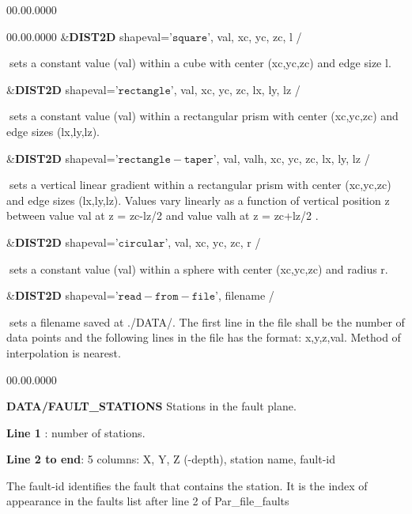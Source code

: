 \begin{lyxlist}{00.00.0000}
\begin{lyxlist}{00.00.0000}
\&\textbf{DIST2D} shapeval='$\mathtt{square}$', val, xc, yc, zc, l /


$\;$sets a constant value (val) within a cube with center (xc,yc,zc)
and edge size l.


\&\textbf{DIST2D} shapeval='$\mathtt{rectangle}$', val, xc, yc, zc,
lx, ly, lz /


$\;$sets a constant value (val) within a rectangular prism with center
(xc,yc,zc) and edge sizes (lx,ly,lz).


\&\textbf{DIST2D} shapeval='$\mathtt{rectangle-taper}$', val, valh,
xc, yc, zc, lx, ly, lz /


$\;$sets a vertical linear gradient within a rectangular prism with
center (xc,yc,zc) and edge sizes (lx,ly,lz). Values vary linearly
as a function of vertical position z between value val at z = zc-lz/2
and value valh at z = zc+lz/2 .


\&\textbf{DIST2D} shapeval='$\mathtt{circular}$', val, xc, yc, zc, r
/


$\;$sets a constant value (val) within a sphere with center (xc,yc,zc)
and radius r.


\&\textbf{DIST2D} shapeval='$\mathtt{read-from-file}$', filename
/


$\;$sets a filename saved at ./DATA/. The first line in the file shall be the 
number of data points and the following lines in the file has the format: 
x,y,z,val. Method of interpolation is nearest. \\


\end{lyxlist}
\end{lyxlist}

\begin{lyxlist}{00.00.0000}
\item [{\textbf{DATA/FAULT\_STATIONS}}] Stations in the fault plane.


\textbf{Line 1} : number of stations.


\textbf{Line 2 to end}: 5 columns: X, Y, Z (-depth), station name,
fault-id


The fault-id identifies the fault that contains the station. It is
the index of appearance in the faults list after line 2 of Par\_file\_faults

\end{lyxlist}

